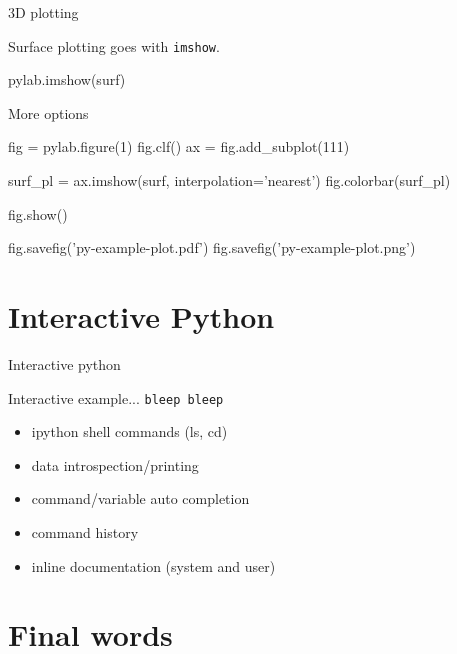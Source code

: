 \documentclass[xetex,10pt]{beamer}
\def\spacer{\vspace*{1em}}
\def\pythoni{\lstinline[language=pythontim]}
\begin{document}
\begin{frame}[fragile]{3D plotting}

Surface plotting goes with \pythoni{imshow}.

\begin{python}
pylab.imshow(surf)
\end{python}

\spacer
More options

\begin{python}
fig = pylab.figure(1)
fig.clf()
ax = fig.add_subplot(111)

surf_pl = ax.imshow(surf, interpolation='nearest')
fig.colorbar(surf_pl)

fig.show()

fig.savefig('py-example-plot.pdf')
fig.savefig('py-example-plot.png')
\end{python}

\end{frame}

\section{Interactive Python}

\begin{frame}[fragile]{Interactive python}

Interactive example... \pause \texttt{bleep bleep}

\spacer
\pause

\begin{itemize}
	\item ipython shell commands (ls, cd)
	\item data introspection/printing
	\item command/variable auto completion
	\item command history
	\item inline documentation (system and user)
\end{itemize}

\end{frame}

\section{Final words}
\end{document}
